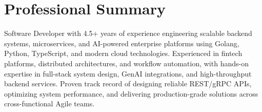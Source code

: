 \section{Professional Summary}
Software Developer with 4.5+ years of experience engineering scalable backend systems, microservices, and AI-powered enterprise platforms using Golang, Python, TypeScript, and modern cloud technologies. Experienced in fintech platforms, distributed architectures, and workflow automation, with hands-on expertise in full-stack system design, GenAI integrations, and high-throughput backend services. Proven track record of designing reliable REST/gRPC APIs, optimizing system performance, and delivering production-grade solutions across cross-functional Agile teams.
